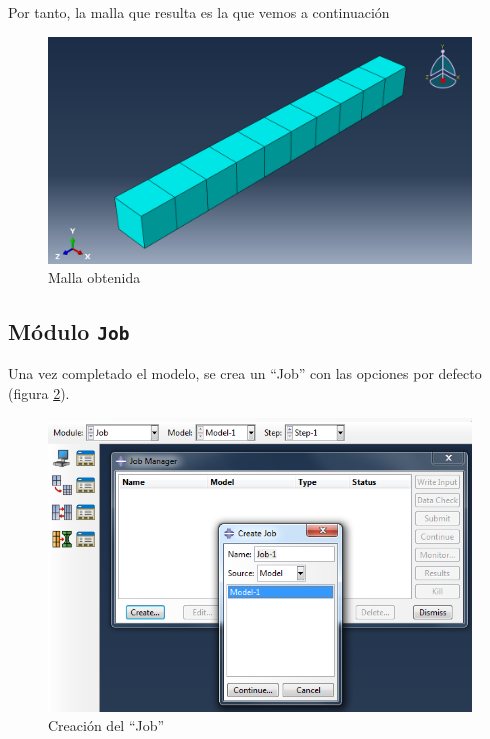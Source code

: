 \documentclass[spanish,a4paper,12pt]{article}
\begin{document}
Por tanto, la malla que resulta es la que vemos a continuación

\begin{figure}[h!tp]
\centering
\includegraphics[scale=0.4]{capturas/mesh2.png}
\caption{Malla obtenida}
\label{fig:mesh2}%
\end{figure}

\clearpage
\subsection{Módulo \texttt{Job}}

Una vez completado el modelo, se crea un ``Job'' con las opciones por defecto
(figura \ref{fig:job-create}).
\begin{figure}[h!tp]
\centering
\includegraphics[scale=0.5]{capturas/37-job.png}
\caption{Creación del ``Job''}
\label{fig:job-create}
\end{figure}
\end{document}
